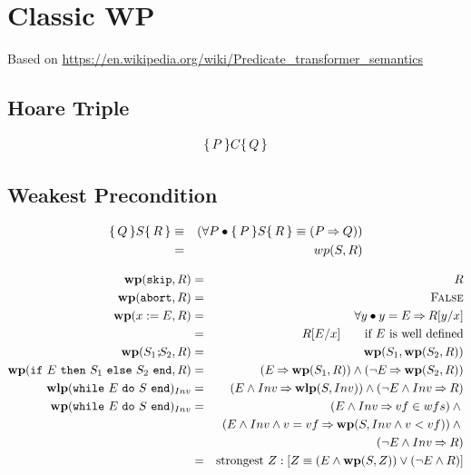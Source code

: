 \section{Classic WP}

Based on \url{https://en.wikipedia.org/wiki/Predicate_transformer_semantics}

\subsection{Hoare Triple}

\begin{eqnarray*}
    \{\,P\,\} C \{\,Q\,\}
\end{eqnarray*}

\subsection{Weakest Precondition}

\begin{eqnarray*}
    \{\,Q\,\}S\{\,R\,\} 
    &\equiv& 
    ( \forall P \bullet
      \{\,P\,\}S\{\,R\,\} \equiv (P \mathbin{\Rightarrow} Q) )
\\ &=& wp(S,R)
\end{eqnarray*}

\def\skipC{\mathtt{skip}}
\def\abortC{\mathtt{abort}}

\def\ifC{\mathtt{if\ }}
\def\thenC{\mathtt{\ then\ }}
\def\elseC{\mathtt{\ else\ }}
\def\endC{\mathtt{\ end}}
\def\whileC{\mathtt{while\ }}
\def\doC{\mathtt{\ do\ }}
\def\fiC{\mathtt{\ fi}}
\def\gotoC{\mathtt{goto\ }}

\def\seqC{\mathbin{\!;\!\!}}
\def\enblC{\rightarrow}
\def\altC{[\!]}

\begin{eqnarray*}
   \wp(\skipC,R) &=& R
\\ \wp(\abortC,R) &=& \False
\\ \wp(x:=E,R) &=& \forall y \bullet y = E \implies R[y/x]
\\             &=& R[E/x] \qquad \text{if $E$ is well defined}
\\ \wp(S_1 \seqC S_2,R) &=& \wp(S_1,\wp(S_2,R))
\\ \wp(\ifC E \thenC S_1 \elseC S_2 \endC,R)
   &=& (E \implies \wp(S_1,R)) \land (\lnot E \implies \wp(S_2,R))
\\ \wlp(\whileC E \doC S \endC)_{Inv}
   &=& (E \land Inv \implies \wlp(S,Inv)) 
       \land 
       (\lnot E \land Inv \implies R)
\\ \wp(\whileC E \doC S \endC)_{Inv}
   &=& (E \land Inv \implies vf \mof wfs) \land {}
\\ & & (E \land Inv \land v = vf \implies \wp(S,Inv \land v < vf)) \land {} 
\\ & & (\lnot E \land Inv \implies R)
\\ &=& \text{strongest\ } 
       Z:[Z \equiv (E \land \wp(S,Z)) \lor (\lnot E \land R)]
\end{eqnarray*}


